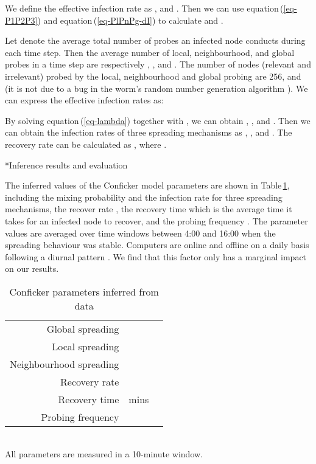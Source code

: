 \documentclass[9pt]{article}
\makeatletter
\newcommand{\refeq}[1]{equation\,(\ref{#1})}
\newcommand{\reftab}[1]{Table\,\ref{#1}}
\renewcommand{\subsection}{\@startsection {subsection}{2}{0pt}{-6pt}{1pt}{\reset@font \normalsize \bfseries}}
\makeatother
\begin{document}
{We define the effective infection rate as ,  and . 
Then we can use \refeq{eq-P1P2P3} and \refeq{eq-PlPnPg-dI} to calculate   and . 


Let  denote the average total number of probes an infected node conducts during each time step. Then the average number of local, neighbourhood, and global probes in a time step are respectively , , and . 
The number of nodes (relevant and irrelevant) probed by the local, neighbourhood and global probing are 256,  and  (it is not  due to a bug in the worm's random number generation algorithm \cite{Eric_2010}). We can express the effective infection rates as:

By solving \refeq{eq-lambda} together with , we can obtain , ,  and . 
Then we can obtain the infection rates of three spreading mechanisms as , , and . 
The recovery rate can be calculated as , where . 

\subsection*{Inference results and evaluation}

The inferred values of the Conficker model parameters are shown in \reftab{tab-pars}, including the mixing probability  and the infection rate  for three spreading mechanisms, the recover rate , the recovery time  which is the average time it takes for an infected node to recover, and the probing frequency . 
The parameter values are averaged over time windows between 4:00 and 16:00 when the spreading behaviour was stable. 
Computers are online and offline on a daily basis following a diurnal pattern \cite{David_2006}. We find that this factor only has a marginal impact on our results.

\begin{table}[h]\small\centering
\caption{Conficker parameters inferred from data} 
\label{tab-pars}
\begin{tabular}{rll}
\hline
Global spreading &  &  \\
Local spreading&   &   \\
Neighbourhood spreading &   &  \\
Recovery rate&  &  \\
Recovery time &  mins \\
Probing frequency& & \\
\hline
\end{tabular}\\
 All parameters are measured in a 10-minute window.
\end{table}

}
\end{document}
